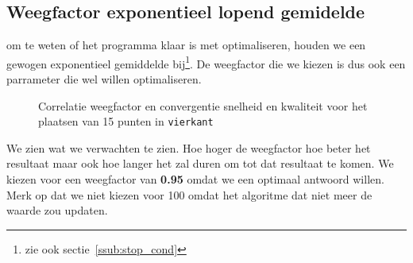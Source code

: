 \subsection{Weegfactor exponentieel lopend gemidelde}
\label{sub:weightingFactor}
om te weten of het programma klaar is met optimaliseren, houden we een gewogen exponentieel gemiddelde bij\footnote{zie ook sectie~\ref{ssub:stop_cond}}. De weegfactor die we kiezen is dus ook een parrameter die wel willen optimaliseren.
\begin{figure}[H]
\caption{Correlatie weegfactor en convergentie snelheid en kwaliteit voor het plaatsen van 15 punten in \texttt{vierkant}}
\label{graf:weightingFactor}
\end{figure}
We zien wat we verwachten te zien. Hoe hoger de weegfactor hoe beter het resultaat maar ook hoe langer het zal duren om tot dat resultaat te komen. 
We kiezen voor een weegfactor van \textbf{0.95} omdat we een optimaal antwoord willen. Merk op dat we niet kiezen voor 100 omdat het algoritme dat niet meer de waarde zou updaten. 
%